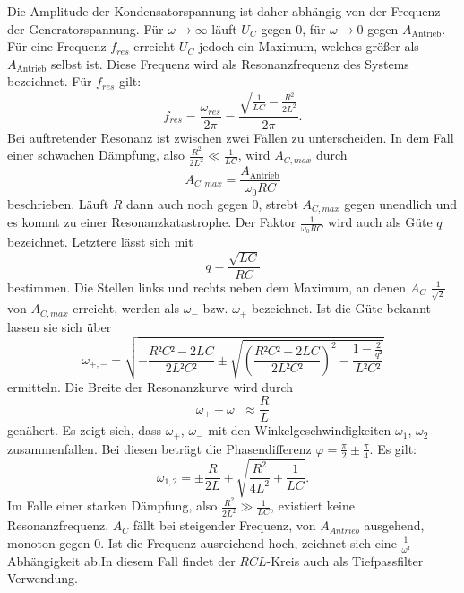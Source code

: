 Die Amplitude der Kondensatorspannung ist daher abhängig von der Frequenz der Generatorspannung.
Für $\omega \to \infty$ läuft $U_C$ gegen 0, für $\omega \to 0$ gegen $A_{\text{Antrieb}}$.
Für eine Frequenz $f_{res}$ erreicht $U_C$  jedoch ein Maximum, welches größer als $A_{\text{Antrieb}}$ selbst ist.
Diese Frequenz wird als Resonanzfrequenz des Systems bezeichnet. Für $f_{res}$ gilt:
\begin{equation}
  f_{res} = \frac{\omega_{res}}{2\pi} = \frac{\sqrt{\frac{1}{LC}-\frac{R^2}{2L^2}}}{2 \pi}\text{.}
\end{equation}
Bei auftretender Resonanz ist zwischen zwei Fällen zu unterscheiden.
In dem Fall einer schwachen Dämpfung, also $\frac{R^2}{2L^2} \ll \frac{1}{LC}$, wird  $A_{C,max}$ durch
\begin{equation}
  A_{C,max} = \frac{A_{\text{Antrieb}}}{\omega_0 RC}
\end{equation}
beschrieben.
 Läuft $R$ dann auch noch gegen 0, strebt $A_{C,max}$ gegen unendlich und es kommt zu einer
Resonanzkatastrophe.
 Der Faktor $\frac{1}{\omega_0 RC}$ wird auch als Güte $q$ bezeichnet.
Letztere lässt sich mit
\begin{equation}
  q = \frac{\sqrt{LC}}{RC}
  \end{equation}
bestimmen. Die Stellen links und rechts neben dem Maximum,
 an denen $A_C$ $\frac{1}{\sqrt{2}}$ von $A_{C,max}$ erreicht, werden als $\omega_-$ bzw. $\omega_+$ bezeichnet.
 Ist die Güte bekannt lassen sie sich über
 \begin{equation}
   \omega_{+,-} = \sqrt{-\frac{R²C²-2LC}{2L²C²} \pm \sqrt{\left( \frac{R²C²-2LC}{2L²C²} \right) ^2 - \frac{1- \frac{2}{q²}}{L²C²}}}
 \end{equation}
 ermitteln.
 Die Breite der Resonanzkurve wird durch
 \begin{equation}
   \omega_+ - \omega_- \approx \frac{R}{L}
 \end{equation}
 genähert. Es zeigt sich, dass $\omega_+$, $\omega_-$ mit den Winkelgeschwindigkeiten $\omega_1$, $\omega_2$ zusammenfallen.
  Bei diesen beträgt die Phasendifferenz $\varphi=\frac{\pi}{2} \pm \frac{\pi}{4}$. Es gilt:
\begin{equation}
  \omega_{1,2} = \pm \frac{R}{2L} + \sqrt{\frac{R^2}{4L^2} + \frac{1}{LC}}\text{.}
\end{equation}
 Im Falle einer starken Dämpfung, also $\frac{R^2}{2L^2} \gg \frac{1}{LC}$, existiert keine Resonanzfrequenz, $A_C$ fällt bei steigender Frequenz, von $A_{Antrieb}$ ausgehend, monoton gegen 0. Ist die Frequenz ausreichend hoch, zeichnet
  sich eine $\frac{1}{\omega²}$ Abhängigkeit ab.In diesem Fall findet der $RCL$-Kreis auch als Tiefpassfilter Verwendung.
